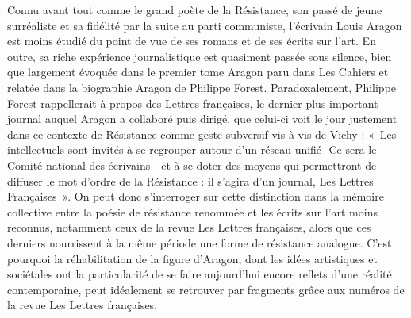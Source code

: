 Connu avant tout comme le grand poète de la Résistance, son passé de jeune surréaliste et sa fidélité par la suite au parti communiste, l’écrivain Louis Aragon est moins étudié du point de vue de ses romans et de ses écrits sur l’art. En outre, sa riche expérience journalistique est quasiment passée sous silence, bien que largement évoquée dans le premier tome Aragon paru dans Les Cahiers et relatée dans la biographie Aragon de Philippe Forest. Paradoxalement, Philippe Forest rappellerait à propos des Lettres françaises, le dernier plus important journal auquel Aragon a collaboré puis dirigé, que celui-ci voit le jour justement dans ce contexte de Résistance comme geste subversif vis-à-vis de Vichy : « Les intellectuels sont invités à se regrouper autour d’un réseau unifié- Ce sera le Comité national des écrivains - et à se doter des moyens qui permettront de diffuser le mot d’ordre de la Résistance : il s’agira d’un journal, Les Lettres Françaises ». On peut donc s’interroger sur cette distinction dans la mémoire collective entre la poésie de résistance renommée et les écrits sur l’art moins reconnus, notamment ceux de la revue Les Lettres françaises, alors que ces derniers nourrissent à la même période une forme de résistance analogue. C’est pourquoi la réhabilitation de la figure d’Aragon, dont les idées artistiques et sociétales ont la particularité de se faire aujourd’hui encore reflets d’une réalité contemporaine, peut idéalement se retrouver par fragments grâce aux numéros de la revue Les Lettres françaises. 
